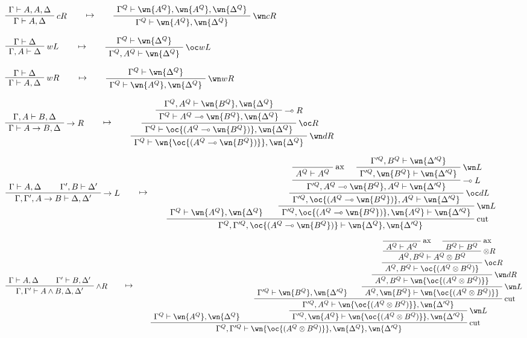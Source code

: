 \(\AxRule{\Gamma\vdash A,A,\Delta}
\LabelRule{c R}
\UnaRule{\Gamma\vdash A,\Delta}
\DisplayProof
\qquad\mapsto\qquad
\AxRule{\Gamma^Q\vdash \wn{A^Q},\wn{A^Q},\wn{\Delta^Q}}
\LabelRule{\wn c R}
\UnaRule{\Gamma^Q\vdash \wn{A^Q},\wn{\Delta^Q}}
\DisplayProof\)

\(\AxRule{\Gamma\vdash \Delta}
\LabelRule{w L}
\UnaRule{\Gamma,A\vdash \Delta}
\DisplayProof
\qquad\mapsto\qquad
\AxRule{\Gamma^Q\vdash \wn{\Delta^Q}}
\LabelRule{\oc w L}
\UnaRule{\Gamma^Q,A^Q\vdash \wn{\Delta^Q}}
\DisplayProof\)

\(\AxRule{\Gamma\vdash \Delta}
\LabelRule{w R}
\UnaRule{\Gamma\vdash A,\Delta}
\DisplayProof
\qquad\mapsto\qquad
\AxRule{\Gamma^Q\vdash \wn{\Delta^Q}}
\LabelRule{\wn w R}
\UnaRule{\Gamma^Q\vdash \wn{A^Q},\wn{\Delta^Q}}
\DisplayProof\)

\(\AxRule{\Gamma,A\vdash B,\Delta}
\LabelRule{\imp R}
\UnaRule{\Gamma\vdash A\imp B,\Delta}
\DisplayProof
\qquad\mapsto\qquad
\AxRule{\Gamma^Q,A^Q\vdash \wn{B^Q},\wn{\Delta^Q}}
\LabelRule{\limp R}
\UnaRule{\Gamma^Q\vdash A^Q\limp \wn{B^Q},\wn{\Delta^Q}}
\LabelRule{\oc R}
\UnaRule{\Gamma^Q\vdash \oc{(A^Q\limp \wn{B^Q})},\wn{\Delta^Q}}
\LabelRule{\wn d R}
\UnaRule{\Gamma^Q\vdash \wn{\oc{(A^Q\limp \wn{B^Q})}},\wn{\Delta^Q}}
\DisplayProof\)

\(\AxRule{\Gamma\vdash A,\Delta}
\AxRule{\Gamma',B\vdash \Delta'}
\LabelRule{\imp L}
\BinRule{\Gamma,\Gamma',A\imp B\vdash \Delta,\Delta'}
\DisplayProof
\qquad\mapsto\qquad
\AxRule{\Gamma^Q\vdash \wn{A^Q},\wn{\Delta^Q}}
\LabelRule{\rulename{ax}}
\NulRule{A^Q\vdash A^Q}
\AxRule{\Gamma'^Q,B^Q\vdash \wn{\Delta'^Q}}
\LabelRule{\wn L}
\UnaRule{\Gamma'^Q,\wn{B^Q}\vdash \wn{\Delta'^Q}}
\LabelRule{\limp L}
\BinRule{\Gamma'^Q,A^Q\limp \wn{B^Q},A^Q\vdash \wn{\Delta'^Q}}
\LabelRule{\oc d L}
\UnaRule{\Gamma'^Q,\oc{(A^Q\limp \wn{B^Q})},A^Q\vdash \wn{\Delta'^Q}}
\LabelRule{\wn L}
\UnaRule{\Gamma'^Q,\oc{(A^Q\limp \wn{B^Q})},\wn{A^Q}\vdash \wn{\Delta'^Q}}
\LabelRule{\rulename{cut}}
\BinRule{\Gamma^Q,\Gamma'^Q,\oc{(A^Q\limp \wn{B^Q})}\vdash \wn{\Delta^Q},\wn{\Delta'^Q}}
\DisplayProof\)

\(\AxRule{\Gamma\vdash A,\Delta}
\AxRule{\Gamma'\vdash B,\Delta'}
\LabelRule{\wedge R}
\BinRule{\Gamma,\Gamma'\vdash A\wedge B,\Delta,\Delta'}
\DisplayProof
\qquad\mapsto\qquad
\AxRule{\Gamma^Q\vdash \wn{A^Q},\wn{\Delta^Q}}
\AxRule{\Gamma'^Q\vdash \wn{B^Q},\wn{\Delta'^Q}}
\LabelRule{\rulename{ax}}
\NulRule{A^Q\vdash A^Q}
\LabelRule{\rulename{ax}}
\NulRule{B^Q\vdash B^Q}
\LabelRule{\tens R}
\BinRule{A^Q,B^Q\vdash A^Q\tens B^Q}
\LabelRule{\oc R}
\UnaRule{A^Q,B^Q\vdash \oc{(A^Q\tens B^Q)}}
\LabelRule{\wn d R}
\UnaRule{A^Q,B^Q\vdash \wn{\oc{(A^Q\tens B^Q)}}}
\LabelRule{\wn L}
\UnaRule{A^Q,\wn{B^Q}\vdash \wn{\oc{(A^Q\tens B^Q)}}}
\LabelRule{\rulename{cut}}
\BinRule{\Gamma'^Q,A^Q\vdash \wn{\oc{(A^Q\tens B^Q)}},\wn{\Delta'^Q}}
\LabelRule{\wn L}
\UnaRule{\Gamma'^Q,\wn{A^Q}\vdash \wn{\oc{(A^Q\tens B^Q)}},\wn{\Delta'^Q}}
\LabelRule{\rulename{cut}}
\BinRule{\Gamma^Q,\Gamma'^Q\vdash \wn{\oc{(A^Q\tens B^Q)}},\wn{\Delta^Q},\wn{\Delta'^Q}}
\DisplayProof\)

